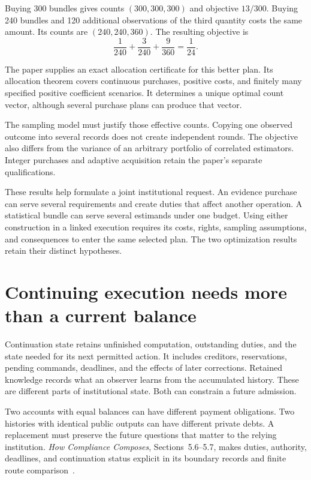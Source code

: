 \documentclass{momentum}
\begin{document}
Buying 300 bundles gives counts $(300,300,300)$ and objective $13/300$.
Buying 240 bundles and 120 additional observations of the third quantity costs the same amount.
Its counts are $(240,240,360)$.
The resulting objective is
\[
\frac{1}{240}+\frac{3}{240}+\frac{9}{360}=\frac{1}{24}.
\]

The paper supplies an exact allocation certificate for this better plan.
Its allocation theorem covers continuous purchases, positive costs, and finitely many specified positive coefficient scenarios.
It determines a unique optimal count vector, although several purchase plans can produce that vector.

The sampling model must justify those effective counts.
Copying one observed outcome into several records does not create independent rounds.
The objective also differs from the variance of an arbitrary portfolio of correlated estimators.
Integer purchases and adaptive acquisition retain the paper's separate qualifications.

These results help formulate a joint institutional request.
An evidence purchase can serve several requirements and create duties that affect another operation.
A statistical bundle can serve several estimands under one budget.
Using either construction in a linked execution requires its costs, rights, sampling assumptions, and consequences to enter the same selected plan.
The two optimization results retain their distinct hypotheses.

\section{Continuing execution needs more than a current balance}
\label{sec:continuation}

Continuation state retains unfinished computation, outstanding duties, and the state needed for its next permitted action.
It includes creditors, reservations, pending commands, deadlines, and the effects of later corrections.
Retained knowledge records what an observer learns from the accumulated history.
These are different parts of institutional state.
Both can constrain a future admission.

Two accounts with equal balances can have different payment obligations.
Two histories with identical public outputs can have different private debts.
A replacement must preserve the future questions that matter to the relying institution.
\emph{How Compliance Composes}, Sections~5.6--5.7, makes duties, authority, deadlines, and continuation status explicit in its boundary records and finite route comparison~\cite{compliance}.
\end{document}
